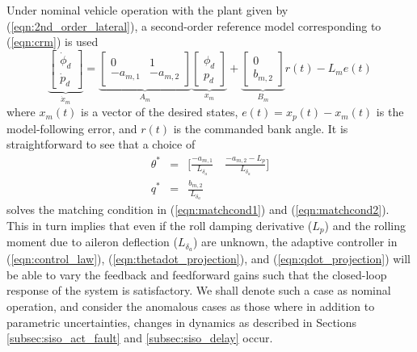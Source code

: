 Under nominal vehicle operation with the plant given by (\ref{eqn:2nd_order_lateral}), a second-order reference model corresponding to (\ref{eqn:crm}) is used
\begin{equation}
	\underbrace{\begin{bmatrix}
		\dot{\phi}_d \\ \dot{p}_d
	\end{bmatrix}}_{\dot{x}_m} = \underbrace{\begin{bmatrix}
		0 & 1\\ -a_{m,1} & -a_{m,2}
	\end{bmatrix}}_{A_m} \underbrace{\begin{bmatrix}
		\phi_d \\ p_d
	\end{bmatrix}}_{x_m} + \underbrace{\begin{bmatrix}
		0 \\ b_{m,2}
	\end{bmatrix}}_{B_m} r(t) - L_m e(t)
	\label{eqn:rm_2_symbolic}
\end{equation}
\noindent where $x_m(t)$ is a vector of the desired states, $e(t) = x_p(t) - x_m(t)$ is the model-following error, and $r(t)$ is the commanded bank angle. It is straightforward to see that a choice of
\begin{eqnarray}
	\theta^* &=& \Big[ \frac{-a_{m,1}}{L_{\delta_a}} \quad \frac{-a_{m,2}-L_p}{L_{\delta_a}} \Big] \label{e:tstar}\\
	q^* &=& \frac{b_{m,2}}{L_{\delta_a}} \label{e:qstar}
\end{eqnarray} 
\noindent solves the matching condition in (\ref{eqn:matchcond1}) and (\ref{eqn:matchcond2}). This in turn implies that even if the roll damping derivative ($L_p$) and the rolling moment due to aileron deflection ($L_{\delta_a}$) are unknown, the adaptive controller in (\ref{eqn:control_law}), (\ref{eqn:thetadot_projection}), and (\ref{eqn:qdot_projection}) will be able to vary the feedback and feedforward gains such that the closed-loop response of the system is satisfactory. We shall denote such a case as nominal operation, and consider the anomalous cases as those where in addition to parametric uncertainties, changes in dynamics as described in Sections \ref{subsec:siso_act_fault} and \ref{subsec:siso_delay} occur.

